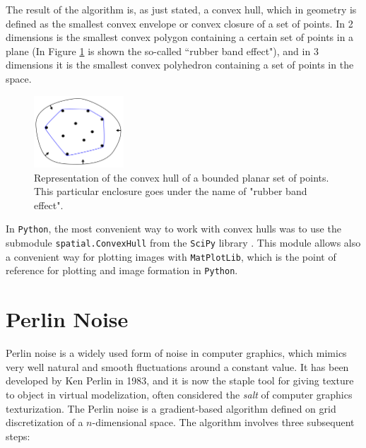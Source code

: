\documentclass[12pt,a4paper]{report}
\begin{document}
    The result of the algorithm is, as just stated, a convex hull, which in geometry is defined as the smallest convex envelope or convex closure of a set of points. In 2 dimensions is the smallest convex polygon containing a certain set of points in a plane (In Figure \ref{fig:conv_hull} is shown the so-called ``rubber band effect"), and in 3 dimensions it is the smallest convex polyhedron containing a set of points in the space.

    \begin{figure}
        \centering
        \includegraphics[width = 0.3\textwidth]{images/conv_hull}
        \caption{Representation of the convex hull of a bounded planar set of points. This particular enclosure goes under the name of "rubber band effect".}
        \label{fig:conv_hull}
    \end{figure}

    In \texttt{Python}, the most convenient way to work with convex hulls was to use the submodule \texttt{spatial.ConvexHull} from the \texttt{SciPy} library \cite{2020SciPy-NMeth}. This module allows also a convenient way for plotting images with \texttt{MatPlotLib}, which is the point of reference for plotting and image formation in \texttt{Python}.

\section{Perlin Noise} \label{ssec:perlin}
    Perlin noise is a widely used form of noise in computer graphics, which mimics very well natural and smooth fluctuations around a constant value. It has been developed by Ken Perlin in 1983, and it is now the staple tool for giving texture to object in virtual modelization, often considered the \textit{salt} of computer graphics texturization.
    The Perlin noise is a gradient-based algorithm defined on grid discretization of a $n$-dimensional space. The algorithm involves three subsequent steps:
\end{document}
